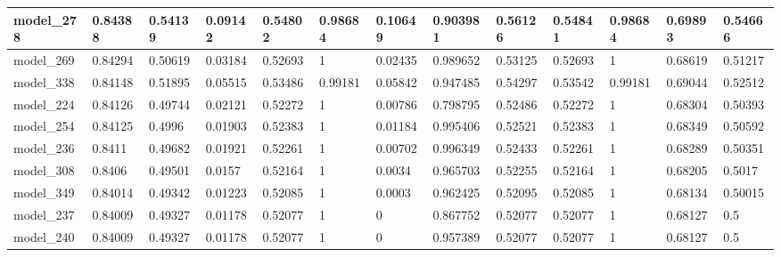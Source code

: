 \begin{tabular}{|l|l|l|l|l|l|l|l|l|l|l|l|l|}
model\_278     & 0.84388     & 0.54139        & 0.09142      & 0.54802          & 0.98684              & 0.10649              & 0.903981     & 0.56126           & 0.54841            & 0.98684         & 0.69893     & 0.54666      \\ \hline
model\_269     & 0.84294     & 0.50619        & 0.03184      & 0.52693          & 1                    & 0.02435              & 0.989652     & 0.53125           & 0.52693            & 1               & 0.68619     & 0.51217      \\ \hline
model\_338     & 0.84148     & 0.51895        & 0.05515      & 0.53486          & 0.99181              & 0.05842              & 0.947485     & 0.54297           & 0.53542            & 0.99181         & 0.69044     & 0.52512      \\ \hline
model\_224     & 0.84126     & 0.49744        & 0.02121      & 0.52272          & 1                    & 0.00786              & 0.798795     & 0.52486           & 0.52272            & 1               & 0.68304     & 0.50393      \\ \hline
model\_254     & 0.84125     & 0.4996         & 0.01903      & 0.52383          & 1                    & 0.01184              & 0.995406     & 0.52521           & 0.52383            & 1               & 0.68349     & 0.50592      \\ \hline
model\_236     & 0.8411      & 0.49682        & 0.01921      & 0.52261          & 1                    & 0.00702              & 0.996349     & 0.52433           & 0.52261            & 1               & 0.68289     & 0.50351      \\ \hline
model\_308     & 0.8406      & 0.49501        & 0.0157       & 0.52164          & 1                    & 0.0034               & 0.965703     & 0.52255           & 0.52164            & 1               & 0.68205     & 0.5017       \\ \hline
model\_349     & 0.84014     & 0.49342        & 0.01223      & 0.52085          & 1                    & 0.0003               & 0.962425     & 0.52095           & 0.52085            & 1               & 0.68134     & 0.50015      \\ \hline
model\_237     & 0.84009     & 0.49327        & 0.01178      & 0.52077          & 1                    & 0                    & 0.867752     & 0.52077           & 0.52077            & 1               & 0.68127     & 0.5          \\ \hline
model\_240     & 0.84009     & 0.49327        & 0.01178      & 0.52077          & 1                    & 0                    & 0.957389     & 0.52077           & 0.52077            & 1               & 0.68127     & 0.5          \\ \hline

\end{tabular}
